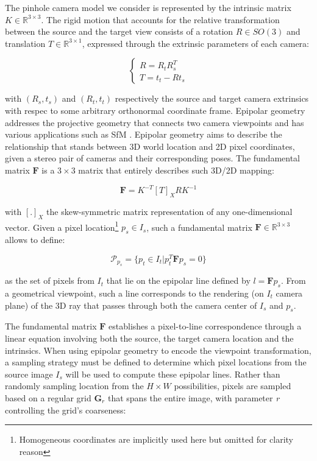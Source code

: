 The pinhole camera model we consider is represented by the intrinsic matrix $K \in \mathbb{R}^{3\times3}$. The rigid motion that accounts for the relative transformation between the source and the target view consists of a rotation $R \in SO(3)$ and translation $T\in \mathbb{R}^{3\times1}$, expressed through the extrinsic parameters of each camera:

\begin{equation}
     \begin{cases}
     R = R_{t} R_{s}^{T} \\
     T = t_{t} - R t_{s}
     \end{cases}
\end{equation}

\noindent with $(R_{s},t_{s})$ and $(R_{t},t_{t})$ respectively the source and target camera extrinsics with respec to some arbitrary orthonormal coordinate frame. Epipolar geometry \citep{hartley2003multiple} addresses the projective geometry that connects two camera viewpoints and has various applications such as \ac{SfM} \citep{tamaazousti2011nonlinear}. Epipolar geometry aims to describe the relationship that stands between 3D world location and 2D pixel coordinates, given a stereo pair of cameras and their corresponding poses. The fundamental matrix $\mathbf{F}$ is a $3\times3$ matrix that entirely describes such 3D/2D mapping: 

\begin{equation}
    \mathbf{F} = K^{-T} [T]_{X} R  K^{-1}
\end{equation}

\noindent with $[.]_{X}$ the skew-symmetric matrix representation of any one-dimensional vector. Given a pixel location\footnote{Homogeneous coordinates are implicitly used here but omitted for clarity reason} $p_{s}\in I_{s}$, such a fundamental matrix $\mathbf{F} \in \mathbb{R}^{3\times3}$ allows to define: 

\begin{equation}
    \mathcal{P}_{p_{s}} = \{p_{t}\in I_{t} | p_{t}^{T}\mathbf{F}p_{s} = 0 \}
\end{equation}

\noindent as the set of pixels from $I_{t}$ that lie on the epipolar line defined by $l=\mathbf{F}p_{s}$. From a geometrical viewpoint, such a line corresponds to the rendering (on $I_{t}$ camera plane) of the 3D ray that passes through both the camera center of $I_{s}$ and $p_{s}$. 

The fundamental matrix $\mathbf{F}$ establishes a pixel-to-line correspondence through a linear equation involving both the source, the target camera location and the intrinsics. When using epipolar geometry to encode the viewpoint transformation, a sampling strategy must be defined to determine which pixel locations from the source image $I_{s}$ will be used to compute these epipolar lines. Rather than randomly sampling location from the $H\times W$ possibilities, pixels are sampled based on a regular grid $\textbf{G}_{r}$ that spans the entire image, with parameter \textit{r} controlling the grid’s coarseness: 

